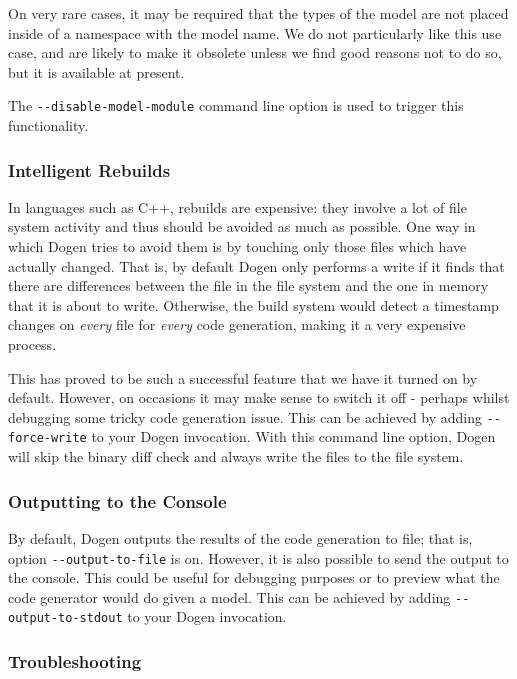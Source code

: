 \documentclass[11pt]{article}
\begin{document}
On very rare cases, it may be required that the types of the model are
not placed inside of a namespace with the model name. We do not
particularly like this use case, and are likely to make it obsolete
unless we find good reasons not to do so, but it is available at
present.

The \texttt{-{}-disable-model-module} command line option is used to trigger
this functionality.

\subsubsection{Intelligent Rebuilds}
\label{sec-3-2-12}

In languages such as C++, rebuilds are expensive: they involve a lot
of file system activity and thus should be avoided as much as
possible. One way in which Dogen tries to avoid them is by touching
only those files which have actually changed. That is, by default
Dogen only performs a write if it finds that there are differences
between the file in the file system and the one in memory that it is
about to write. Otherwise, the build system would detect a timestamp
changes on \emph{every} file for \emph{every} code generation, making it a very
expensive process.

This has proved to be such a successful feature that we have it turned
on by default. However, on occasions it may make sense to switch it
off - perhaps whilst debugging some tricky code generation issue. This
can be achieved by adding \texttt{-{}-force-write} to your Dogen
invocation. With this command line option, Dogen will skip the binary
diff check and always write the files to the file system.

\subsubsection{Outputting to the Console}
\label{sec-3-2-13}

By default, Dogen outputs the results of the code generation to file;
that is, option \texttt{-{}-output-to-file} is on. However, it is also possible
to send the output to the console. This could be useful for debugging
purposes or to preview what the code generator would do given a
model. This can be achieved by adding \texttt{-{}-output-to-stdout} to your
Dogen invocation.

\subsubsection{Troubleshooting}
\label{sec-3-2-14}
\end{document}
